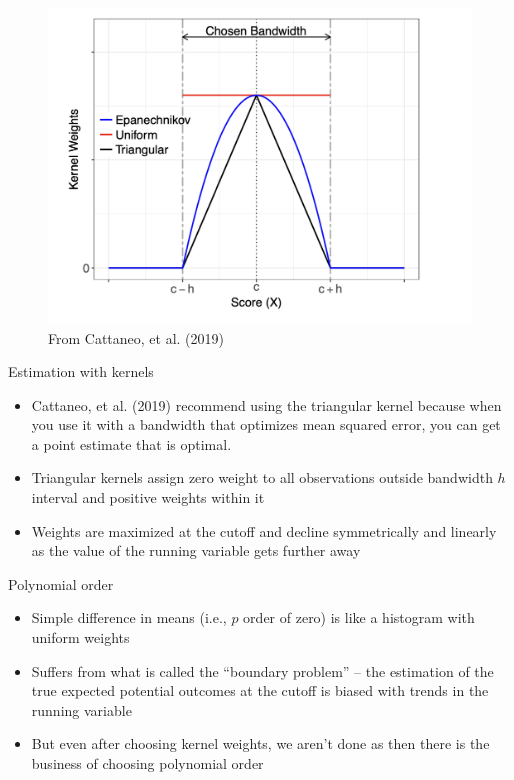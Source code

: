 \documentclass{beamer}
\begin{document}
\begin{frame}

		\begin{figure}
		\includegraphics[scale=0.4]{./lecture_includes/cattaneo_kernels}
		\caption{From Cattaneo, et al. (2019)}
		\end{figure}

\end{frame}


\begin{frame}{Estimation with kernels}


\begin{itemize}
\item Cattaneo, et al. (2019) recommend using the triangular kernel because when you use it with a bandwidth that optimizes mean squared error, you can get a point estimate that is optimal. 
\item Triangular kernels assign zero weight to all observations outside bandwidth $h$ interval and positive weights within it
\item Weights are maximized at the cutoff and decline symmetrically and linearly as the value of the running variable gets further away
\end{itemize}

\end{frame}





\begin{frame}{Polynomial order}

\begin{itemize}
\item Simple difference in means (i.e., $p$ order of zero) is like a histogram with uniform weights
\item Suffers from what is called the ``boundary problem'' -- the estimation of the true expected potential outcomes at the cutoff is biased with trends in the running variable
\item But even after choosing kernel weights, we aren't done as then there is the business of choosing polynomial order
\end{itemize}

\end{frame}
\end{document}
